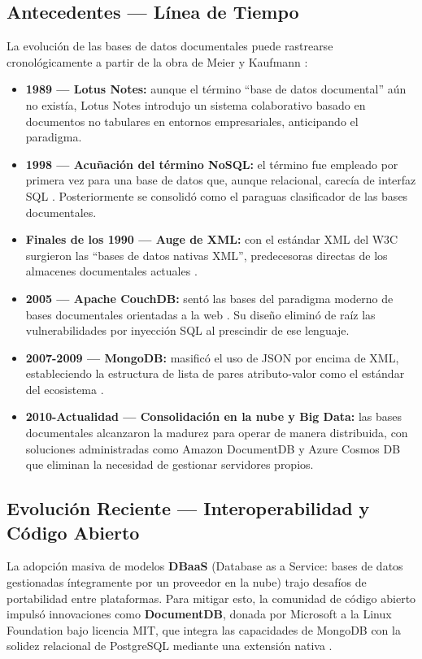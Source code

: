 \documentclass[conference]{IEEEtran}
\begin{document}
\subsection{Antecedentes — Línea de Tiempo}
La evolución de las bases de datos documentales puede rastrearse cronológicamente a partir de la obra de Meier y Kaufmann \cite{meier2019}:
\begin{itemize}
    \item \textbf{1989 — Lotus Notes:} aunque el término ``base de datos documental'' aún no existía, Lotus Notes introdujo un sistema colaborativo basado en documentos no tabulares en entornos empresariales, anticipando el paradigma.
    \item \textbf{1998 — Acuñación del término NoSQL:} el término fue empleado por primera vez para una base de datos que, aunque relacional, carecía de interfaz SQL \cite{meier2019}. Posteriormente se consolidó como el paraguas clasificador de las bases documentales.
    \item \textbf{Finales de los 1990 — Auge de XML:} con el estándar XML del W3C surgieron las ``bases de datos nativas XML'', predecesoras directas de los almacenes documentales actuales \cite{meier2019}.
    \item \textbf{2005 — Apache CouchDB:} sentó las bases del paradigma moderno de bases documentales orientadas a la web \cite{meier2019}. Su diseño eliminó de raíz las vulnerabilidades por inyección SQL al prescindir de ese lenguaje.
    \item \textbf{2007-2009 — MongoDB:} masificó el uso de JSON por encima de XML, estableciendo la estructura de lista de pares atributo-valor como el estándar del ecosistema \cite{meier2019}.
    \item \textbf{2010-Actualidad — Consolidación en la nube y Big Data:} las bases documentales alcanzaron la madurez para operar de manera distribuida, con soluciones administradas como Amazon DocumentDB y Azure Cosmos DB que eliminan la necesidad de gestionar servidores propios.
\end{itemize}

\subsection{Evolución Reciente — Interoperabilidad y Código Abierto}
La adopción masiva de modelos \textbf{DBaaS} (Database as a Service: bases de datos gestionadas íntegramente por un proveedor en la nube) trajo desafíos de portabilidad entre plataformas. Para mitigar esto, la comunidad de código abierto impulsó innovaciones como \textbf{DocumentDB}, donada por Microsoft a la Linux Foundation bajo licencia MIT, que integra las capacidades de MongoDB con la solidez relacional de PostgreSQL mediante una extensión nativa \cite{harper2025}.
\end{document}
